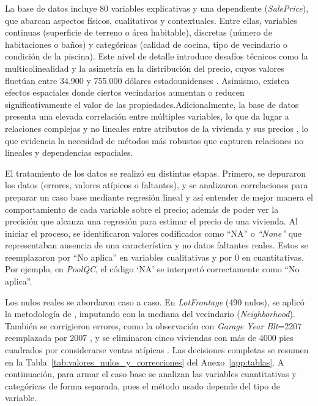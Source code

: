 La base de datos incluye 80 variables explicativas y una dependiente (\textit{SalePrice}), que abarcan aspectos físicos, cualitativos y contextuales. Entre ellas, variables continuas (superficie de terreno o área habitable), discretas (número de habitaciones o baños) y categóricas (calidad de cocina, tipo de vecindario o condición de la piscina).
Este nivel de detalle introduce desafíos técnicos como la multicolinealidad y la asimetría en la distribución del precio, cuyos valores fluctúan entre 34.900 y 755.000 dólares estadounidenses \cite{ozdemir2022}.
Asimismo, existen efectos espaciales donde ciertos vecindarios aumentan o reducen significativamente el valor de las propiedades.Adicionalmente, la base de datos presenta una elevada correlación entre múltiples variables, lo que da lugar a relaciones complejas y no lineales entre atributos de la vivienda y sus precios \cite{decock2011}, lo que evidencia la necesidad de métodos más robustos que capturen relaciones no lineales y dependencias espaciales.

El tratamiento de los datos se realizó en distintas etapas. Primero, se depuraron los datos (errores, valores atípicos o faltantes), y se analizaron correlaciones para preparar un caso base mediante regresión lineal y así entender de mejor manera el comportamiento de cada variable sobre el precio; además de poder ver la precisión que alcanza una regresión para estimar el precio de una vivienda. Al iniciar el proceso, se identificaron valores codificados como “NA” o \textit{“None”} que representaban ausencia de una característica y no datos faltantes reales. Estos se reemplazaron por “No aplica” en variables cualitativas y por 0 en cuantitativas. Por ejemplo, en \textit{PoolQC}, el código ‘NA’ se interpretó correctamente como “No aplica”.  

Los nulos reales se abordaron caso a caso. En \textit{LotFrontage} (490 nulos), se aplicó la metodología de , imputando con la mediana del vecindario (\textit{Neighborhood}). También se corrigieron errores, como la observación con \textit{Garage Year Blt}=2207 reemplazada por 2007 \cite{marcelino2017}, y se eliminaron cinco viviendas con más de 4000 pies cuadrados por considerarse ventas atípicas \cite{decock2011}. Las decisiones completas se resumen en la Tabla~\ref{tab:valores_nulos_y_correcciones} del Anexo~\ref{app:tablas}. A continuación, para armar el caso base se analizan las variables cuantitativas y categóricas de forma separada, pues el método usado depende del tipo de variable. 


